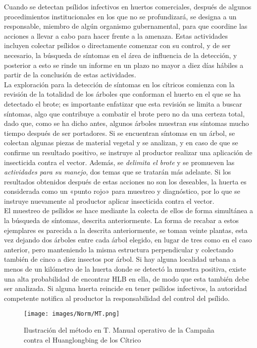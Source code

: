 Cuando se detectan psílidos infectivos en huertos comerciales, después de algunos procedimientos institucionales en los que no se profundizará, se designa a un responsable, miembro de algún organismo gubernamental, para que coordine las acciones a llevar a cabo para hacer frente a la amenaza. Estas actividades incluyen colectar psílidos o directamente comenzar con su control, y de ser necesario, la búsqueda de síntomas en el área de influencia de la detección, y posterior a esto se rinde un informe en un plazo no mayor a diez días hábiles a partir de la conclusión de estas actividades.\\
La exploración para la detección de síntomas en los cítricos comienza con la revisión de la totalidad de los árboles que conforman el huerto en el que se ha detectado el brote; es importante enfatizar que esta revisión se limita a buscar síntomas, algo que contribuye a combatir el brote pero no da una certeza total, dado que, como se ha dicho antes, algunos árboles muestran sus síntomas mucho tiempo después de ser portadores. Si se encuentran síntomas en un árbol, se colectan algunas piezas de material vegetal y se analizan, y en caso de que se confirme un resultado positivo, se instruye al productor realizar una aplicación de insecticida contra el vector. Además, se \textit{delimita el brote} y se promueven las \textit{actividades para su manejo}, dos temas que se tratarán más adelante. Si los resultados obtenidos después de estas acciones no son los deseables, la huerta es considerada como un «punto rojo» para muestreo y diagnóstico, por lo que se instruye nuevamente al productor aplicar insecticida contra el vector.\\
El muestreo de psílidos se hace mediante la colecta de ellos de forma simultánea a la búsqueda de síntomas, descrita anteriormente. La forma de recabar a estos ejemplares es parecida a la descrita anteriormente, se toman veinte plantas, esta vez dejando dos árboles entre cada árbol elegido, en lugar de tres como en el caso anterior, pero manteniendo la misma estructura perpendicular y colectando también de cinco a diez insectos por árbol. Si hay alguna localidad urbana a menos de un kilómetro de la huerta donde se detectó la muestra positiva, existe una alta probabilidad de encontrar HLB en ella, de modo que esta también debe ser analizada. Si alguna huerta reincide en tener psílidos infectivos, la autoridad competente notifica al productor la responsabilidad del control del psílido.\\
\begin{figure}[H]
\centering
\texttt{[image: images/Norm/MT.png]}
\caption{Ilustración del método en T. Manual operativo de la Campaña contra el Huanglongbing de los Cítrico}
\end{figure}
